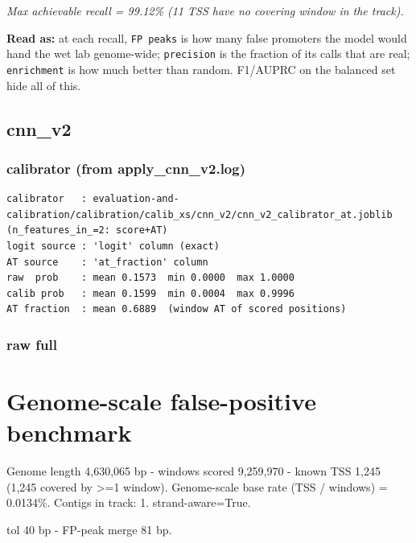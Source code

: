 \documentclass[10pt]{article}
\begin{document}
{\itshape Max achievable recall = 99.12\% (11 TSS have no covering window in the track).}

\textbf{Read as:} at each recall, \texttt{FP peaks} is how many false promoters the model would hand the wet lab genome-wide; \texttt{precision} is the fraction of its calls that are real; \texttt{enrichment} is how much better than random. F1/AUPRC on the balanced set hide all of this.

\subsection*{cnn\_v2}

\subsubsection*{calibrator (from apply\_cnn\_v2.log)}
\begin{verbatim}
calibrator   : evaluation-and-calibration/calibration/calib_xs/cnn_v2/cnn_v2_calibrator_at.joblib  (n_features_in_=2: score+AT)
logit source : 'logit' column (exact)
AT source    : 'at_fraction' column
raw  prob    : mean 0.1573  min 0.0000  max 1.0000
calib prob   : mean 0.1599  min 0.0004  max 0.9996
AT fraction  : mean 0.6889  (window AT of scored positions)
\end{verbatim}

\subsubsection*{raw \textperiodcentered{} full}
\section*{Genome-scale false-positive benchmark}

Genome length 4,630,065 bp - windows scored 9,259,970 - known TSS 1,245 (1,245 covered by >=1 window). Genome-scale base rate (TSS / windows) = 0.0134\%. Contigs in track: 1. strand-aware=True.

tol 40 bp - FP-peak merge 81 bp.

\begin{center}
\end{center}
\end{document}
